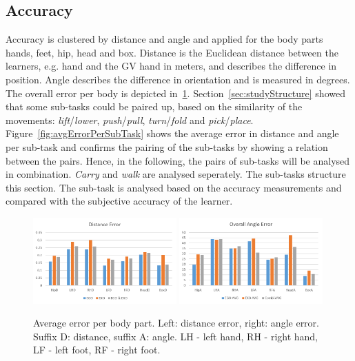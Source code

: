 \subsection{Accuracy}
Accuracy is clustered by distance and angle and applied for the body parts hands, feet, hip, head and box. Distance is the Euclidean distance between the learners, e.g. hand and the GV hand in meters, and describes the difference in position. Angle describes the difference in orientation and is measured in degrees. The overall error per body is depicted in~\ref{fig:overallError}.
Section~\ref{sec:studyStructure} showed that some sub-tasks could be paired up, based on the similarity of the movements: \textit{lift}/\textit{lower}, \textit{push}/\textit{pull}, \textit{turn}/\textit{fold} and \textit{pick}/\textit{place}. Figure~\ref{fig:avgErrorPerSubTask} shows the average error in distance and angle per sub-task and confirms the pairing of the sub-tasks by showing a relation between the pairs. Hence, in the following, the pairs of sub-tasks will be analysed in combination. \textit{Carry} and \textit{walk} are analysed seperately. The sub-tasks structure this section. The sub-task is analysed based on the accuracy measurements and compared with the subjective accuracy of the learner.
\begin{figure}[H]
	\centering
	\includegraphics[width=0.49\textwidth]{figures/overallDistanceError.png}
	\includegraphics[width=0.49\textwidth]{figures/overallAngleError.png}
	\caption[Average error per body part in meter.]{Average error per body part. Left: distance error, right: angle error. Suffix D: distance, suffix A: angle. LH - left hand, RH - right hand, LF - left foot, RF - right foot.}
	\label{fig:overallError}
\end{figure}
